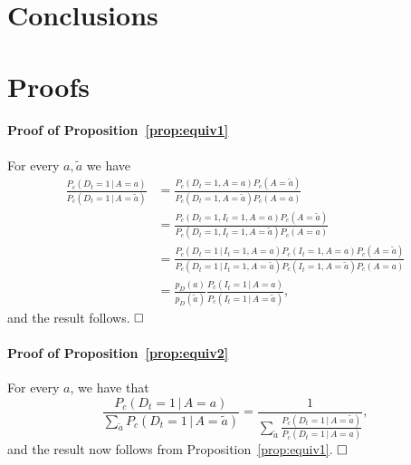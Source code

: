 \documentclass[a4paper]{article}
\newcommand{\given}{\, \vert \,}
\begin{document}
\section{Conclusions}

\begin{center}
\end{center}



\appendix

\section{Proofs}

\paragraph{Proof of Proposition~\ref{prop:equiv1}}
For every $a, \tilde{a}$ we have 
\begin{align*}
\frac{P_c(D_t = 1\,|\,A = a)}
{P_c(D_t = 1\,|\, A = \tilde{a})} 
&= 
\frac{
P_c(D_t = 1,A = a)
P_c(A = \tilde{a})}
{P_c(D_t = 1, A = \tilde{a})P_c(A = a)}  \\
&= 
\frac{
P_c(D_t = 1,I_t = 1, A = a)P_c(A = \tilde{a})}
{P_c(D_t = 1,I_t = 1, A = \tilde{a})P_c(A = a)} \\
&= 
\frac{
P_c(D_t = 1\,|\,I_t = 1, A = a)P_c(I_t = 1,A = a)P_c(A = \tilde{a})}
{P_c(D_t = 1\,|\,I_t = 1, A = \tilde{a})P_c(I_t = 1,A = \tilde{a})P_c(A = a)} \\
&= 
\frac{p_D(a)}{p_D(\tilde{a})}  \frac{P_c(I_t = 1\,|\,A = a)}{P_c(I_t = 1\,|\,A = \tilde{a})} ,
\end{align*}
and the result follows. $\hfill \square$

\paragraph{Proof of Proposition~\ref{prop:equiv2}}
For every $a$, we have that 
\begin{equation*} 
\frac{P_c(D_t = 1 \given A = a)}
{\sum_{\tilde{a}} P_c(D_t = 1 \given A = \tilde{a})}
= 
\frac{1}{\sum_{\tilde{a}} \frac{P_c(D_t = 1\,|\,A = \tilde{a})}{P_c(D_t = 1\,|\,A = a)}},
\end{equation*}
and the result now follows from Proposition~\ref{prop:equiv1}. $\hfill \square$
\end{document}
